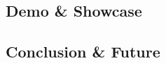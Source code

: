 \documentclass[12pt,a4paper,titlepage,listof=totoc,bibliography=totoc,chapteratlists=0pt]{scrreprt}
\begin{document}
\begin{spacing}{1}
\chapter{Demo \& Showcase}\label{chapter:demo}
\end{spacing}


\begin{spacing}{1}
\chapter{Conclusion \& Future}
\end{spacing}


\newpage
{}
\setcounter{page}{\value{RPages}}
\glsnogroupskiptrue
\printnoidxglossary[title=Glossary,toctitle=Glossary,style=long,sort=word]
\listoffigures
\listoftables
\lstlistoflistings
\appendix
{}

\end{document}
